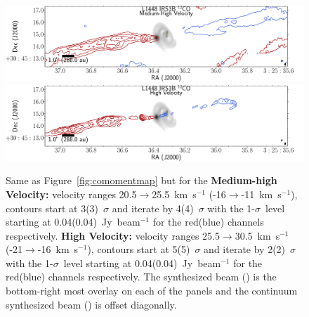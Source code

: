 \begin{figure}[H]
   \begin{center}
   \includegraphics[width=\textwidth]{img/L1448IRS3B_12CO_image_binned_clean__high.pdf}
   \includegraphics[width=\textwidth]{img/L1448IRS3B_12CO_image_binned_clean__ultrahigh.pdf}
   \caption{Same as Figure~\ref{fig:comomentmap} but for the \textbf{Medium-high Velocity:} velocity ranges 20.5$\rightarrow$25.5~km~s$^{-1}$ (-16$\rightarrow$-11~km~s$^{-1}$), contours start at 3(3)~$\sigma$ and iterate by 4(4)~$\sigma$ with the 1-$\sigma$~level starting at 0.04(0.04)~Jy~beam$^{-1}$ for the red(blue) channels respectively. \textbf{High Velocity:} velocity ranges 25.5$\rightarrow$30.5~km~s$^{-1}$ (-21$\rightarrow$-16~km~s$^{-1}$), contours start at 5(5)~$\sigma$ and iterate by 2(2)~$\sigma$ with the 1-$\sigma$~level starting at 0.04(0.04)~Jy~beam$^{-1}$ for the red(blue) channels respectively. The \co\space synthesized beam (\cobeam) is the bottom-right most overlay on each of the panels and the continuum synthesized beam (\contbeam) is offset diagonally.}\label{fig:comomentmap2}
\end{center}
\end{figure}

